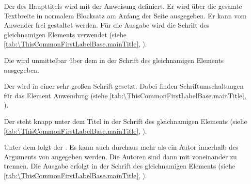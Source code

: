 \BeginIndexGroup{}%
%
Der
 des Haupttitels wird mit der
Anweisung  definiert. Er wird über die gesamte Textbreite in
normalem Blocksatz am Anfang der Seite ausgegeben. Er kann vom Anwender frei
gestaltet werden. Für die Ausgabe wird die
Schrift des gleichnamigen Elements
verwendet (siehe \autoref{tab:\ThisCommonFirstLabelBase.mainTitle},
).%
\EndIndexGroup

\BeginIndexGroup{}%
Die
 wird unmittelbar über dem
 in der Schrift des
gleichnamigen Elements ausgegeben.%
\EndIndexGroup

\BeginIndexGroup{}%
Der  wird in einer sehr großen Schrift
gesetzt.  Dabei finden %
Schriftumschaltungen für das Element
%
 Anwendung (siehe
\autoref{tab:\ThisCommonFirstLabelBase.mainTitle},
).%
\EndIndexGroup

\BeginIndexGroup{}%
Der
 steht knapp unter dem Titel in der
Schrift des gleichnamigen Elements (siehe
\autoref{tab:\ThisCommonFirstLabelBase.mainTitle},
).%
\EndIndexGroup

\BeginIndexGroup{}%
Unter dem  folgt der
. Es kann auch durchaus mehr als ein
Autor innerhalb des Arguments von  angegeben werden. Die Autoren
sind dann mit  voneinander zu trennen. Die
Ausgabe erfolgt in der Schrift des
gleichnamigen Elements (siehe
\autoref{tab:\ThisCommonFirstLabelBase.mainTitle},
).%
\EndIndexGroup

